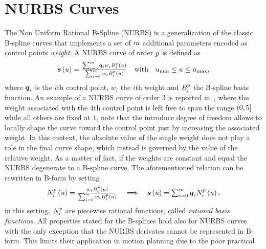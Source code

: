 \section{NURBS Curves}
The Non Uniform Rational B-Spline (NURBS) is a generalization of the classic B-spline curves that implements a set of $m$ additional
parameters encoded as control points \emph{weight}. A NURBS curve of order $p$ is defined as
\begin{equation*}
    \begin{matrix}
        \boldsymbol{s}\left( u \right) = \frac{\sum_{i=0}^{m} \boldsymbol{q}_{i}w_{i}B_{i}^{p} \left( u \right)}
        {\sum_{i=0}^{m} w_{i}B_{i}^{p} \left( u \right)} & \text{with} & u_{\text{min}} \le u \le u_{\text{max}},
    \end{matrix}
\end{equation*}
where $\boldsymbol{q}_{i}$ is the $i$th control point, $w_{i}$ the $i$th weight and $B_{i}^{p}$ the B-spline basis function.
An example of a NURBS curve of order $3$ is reported in~, where the weight associated with the $4$th 
control point is left free to span the range $\left( 0, 5 \right]$ while all others are fixed at $1$, note that the introduce degree
of freedom allows to locally shape the curve toward the control point just by increasing the associated weight.
In this context, the absolute value of the single weight does not play a role in the final curve shape, which instead is governed
by the value of the relative weight. As a matter of fact, if the weights are constant and equal the NURBS degenerate to a B-spline curve.
The aforementioned relation can be rewritten in B-form by setting
\begin{equation*}
    \begin{matrix}
        N_{i}^{p} \left( u \right) = \frac{w_{i}B_{i}^{p} \left( u \right)}
        {\sum_{i=0}^{m} w_{i}B_{i}^{p} \left( u \right)}
        & \implies &
        \boldsymbol{s} \left( u \right) = \sum_{i=0}^{m} \boldsymbol{q}_i N_i^{p} \left( u \right),
    \end{matrix}
\end{equation*}
in this setting, $N_{i}^{p}$ are piecewise rational functions, called \emph{rational basis functions}.
All properties stated for the B-splines hold also for NURBS curves with the only exception that the NURBS derivates
cannot be represented in B-form. This limits their application in motion planning due to the poor practical
